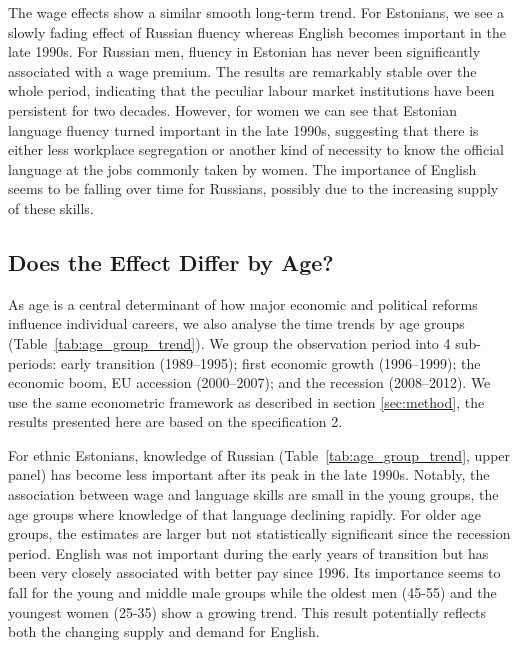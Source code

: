 \documentclass[12pt, a4paper]{article}
\begin{document}
The wage effects show a similar smooth long-term trend. For Estonians, we
see a slowly fading effect of Russian fluency whereas
English becomes important in the late 1990s. For Russian men, fluency in Estonian
has never been significantly associated with a wage premium.
The results are remarkably stable over the whole period, indicating
that the peculiar labour market institutions have been persistent for
two decades. However, for women we can see that Estonian language fluency turned
important in the late 1990s, suggesting that there is either less
workplace segregation or another kind of necessity to know the official
language at
the jobs commonly taken by women. The
importance of English seems to be falling over time for Russians, possibly
due to the increasing supply of these skills. 


\subsection{Does the Effect Differ by Age?}
\label{sec:age_groups}
As age is a central determinant of how major economic and political
reforms influence individual careers, 
we also analyse the time trends by age groups
(Table~\ref{tab:age_group_trend}).
We group the observation period into 4 sub-periods: early transition
(1989--1995); first economic growth (1996--1999);
the economic boom, EU accession (2000--2007); and the recession
(2008--2012).
We use the same econometric framework as described in section
\ref{sec:method}, the results presented here are based on the specification 2.

For ethnic Estonians, knowledge of Russian
(Table~\ref{tab:age_group_trend}, upper panel) has become less
important after its peak in the late 1990s. Notably, the
association between wage and language skills are small in the
young groups, the age groups where knowledge of that language
declining rapidly.
For older age groups, the estimates are larger but not statistically
significant since the recession period. English was not important
during the early years of transition but has been very closely
associated with better pay since 1996. Its importance seems to
fall for the young and middle male groups while the oldest men
(45-55) and the youngest women (25-35) show a growing trend.
This result potentially reflects both the changing supply and demand for 
English.
\end{document}

